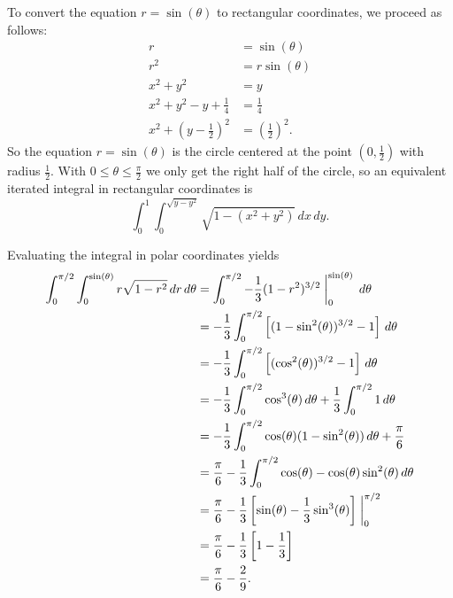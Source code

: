 \begin{exercises}
\begin{exerciseSolution}
	\item To convert the equation $r = \sin(\theta)$ to rectangular coordinates, we proceed as follows:
\begin{align*}
r &= \sin(\theta) \\
r^2 &= r \sin(\theta) \\
x^2+y^2 &= y \\
x^2+y^2-y + \frac{1}{4} &= \frac{1}{4} \\
x^2 + \left(y-\frac{1}{2}\right)^2 &= \left(\frac{1}{2}\right)^2.
\end{align*}
So the equation $r = \sin(\theta)$ is the circle centered at the point $\left( 0, \frac{1}{2}\right)$ with radius $\frac{1}{2}$. With $0 \leq \theta \leq \frac{\pi}{2}$ we only get the right half of the circle, so an equivalent iterated integral in rectangular coordinates is
\[\int_0^1 \int_{0}^{\sqrt{y-y^2}} \sqrt{1-(x^2+y^2)} \, dx \, dy.\]

Evaluating the integral in polar coordinates yields
\begin{align*}
\int_0^{\pi/2} \int_0^{\sin(\theta)} r\sqrt{1-r^2} \, dr \, d\theta &= \int_{0}^{\pi/2} -\frac{1}{3} (1-r^2)^{3/2}\biggm|_{0}^{\sin(\theta)} \, d\theta \\
	&= -\frac{1}{3} \int_{0}^{\pi/2}  \left[(1-\sin^2(\theta))^{3/2}-1 \right] \, d\theta \\
	&= -\frac{1}{3} \int_{0}^{\pi/2}  \left[(\cos^2(\theta))^{3/2} - 1 \right]  \, d\theta \\
	&= -\frac{1}{3} \int_{0}^{\pi/2}  \cos^3(\theta) \, d\theta + \frac{1}{3} \int_{0}^{\pi/2} 1  \, d\theta \\
	&= -\frac{1}{3} \int_{0}^{\pi/2}  \cos(\theta)(1-\sin^2(\theta)) \, d\theta + \frac{\pi}{6} \\
	&= \frac{\pi}{6} -\frac{1}{3} \int_{0}^{\pi/2}  \cos(\theta)- \cos(\theta)\sin^2(\theta) \, d\theta  \\
	&= \frac{\pi}{6} -\frac{1}{3} \left[ \sin(\theta)- \frac{1}{3}\sin^3(\theta)\right] \biggm|_{0}^{\pi/2}  \\
	&= \frac{\pi}{6} -\frac{1}{3} \left[ 1- \frac{1}{3}\right]   \\
	&= \frac{\pi}{6} -\frac{2}{9}.   
\end{align*}




\end{exerciseSolution}
\end{exercises}
